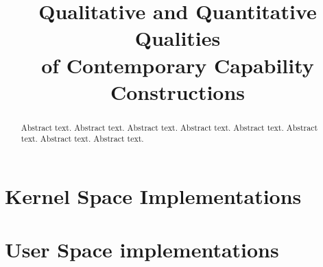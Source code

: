 \documentclass[conference]{IEEEtran}
\begin{document}
\title{Qualitative and Quantitative Qualities \\ of Contemporary Capability Constructions}

\author{
  \and
  \and
}

\date{}


\maketitle
\begin{abstract}
Abstract text. Abstract text. Abstract text. Abstract text. Abstract text. Abstract text. Abstract text. Abstract text.
\end{abstract}

	

\section{Kernel Space Implementations}
 
 


\hfill
\section{User Space implementations}
	
	
	










\end{document}
